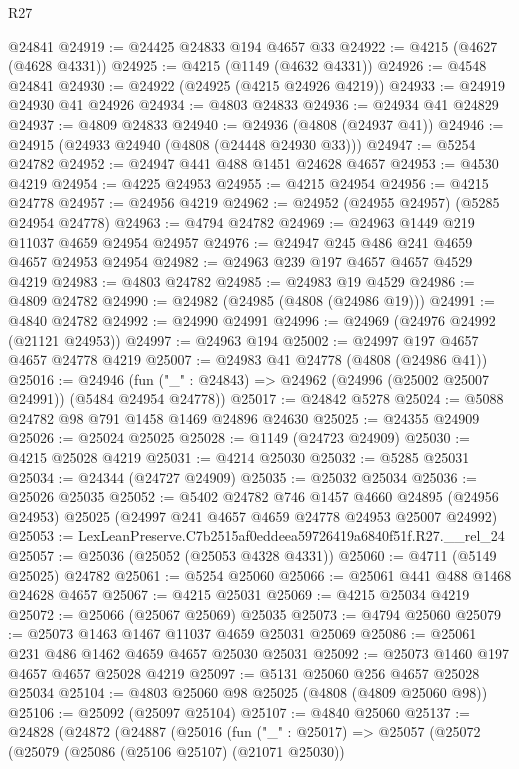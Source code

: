 \begin{lexlean}{R27}
\begin{coremodule}
    @24841
@24919 := @24425 @24833 @194 @4657 @33
@24922 := @4215 (@4627 (@4628 @4331))
@24925 := @4215 (@1149 (@4632 @4331))
@24926 := @4548 @24841
@24930 := @24922 (@24925 (@4215 @24926 @4219))
@24933 := @24919 @24930 @41 @24926
@24934 := @4803 @24833
@24936 := @24934 @41 @24829
@24937 := @4809 @24833
@24940 := @24936 (@4808 (@24937 @41))
@24946 := @24915 (@24933 @24940 (@4808 (@24448 @24930 @33)))
@24947 := @5254 @24782
@24952 := @24947 @441 @488 @1451 @24628 @4657
@24953 := @4530 @4219
@24954 := @4225 @24953
@24955 := @4215 @24954
@24956 := @4215 @24778
@24957 := @24956 @4219
@24962 := @24952 (@24955 @24957) (@5285 @24954 @24778)
@24963 := @4794 @24782
@24969 := @24963 @1449 @219 @11037 @4659 @24954 @24957
@24976 := @24947 @245 @486 @241 @4659 @4657 @24953 @24954
@24982 := @24963 @239 @197 @4657 @4657 @4529 @4219
@24983 := @4803 @24782
@24985 := @24983 @19 @4529
@24986 := @4809 @24782
@24990 := @24982 (@24985 (@4808 (@24986 @19)))
@24991 := @4840 @24782
@24992 := @24990 @24991
@24996 := @24969 (@24976 @24992 (@21121 @24953))
@24997 := @24963 @194
@25002 := @24997 @197 @4657 @4657 @24778 @4219
@25007 := @24983 @41 @24778 (@4808 (@24986 @41))
@25016 := @24946
    (fun ("_" : @24843) => @24962 (@24996 (@25002 @25007 @24991)) (@5484 @24954 @24778))
@25017 := @24842 @5278
@25024 := @5088 @24782 @98 @791 @1458 @1469 @24896 @24630
@25025 := @24355 @24909
@25026 := @25024 @25025
@25028 := @1149 (@24723 @24909)
@25030 := @4215 @25028 @4219
@25031 := @4214 @25030
@25032 := @5285 @25031
@25034 := @24344 (@24727 @24909)
@25035 := @25032 @25034
@25036 := @25026 @25035
@25052 := @5402
    @24782
    @746
    @1457
    @4660
    @24895
    (@24956 @24953)
    @25025
    (@24997 @241 @4657 @4659 @24778 @24953 @25007 @24992)
@25053 := LexLeanPreserve.C7b2515af0eddeea59726419a6840f51f.R27.__rel_24
@25057 := @25036 (@25052 (@25053 @4328 @4331))
@25060 := @4711 (@5149 @25025) @24782
@25061 := @5254 @25060
@25066 := @25061 @441 @488 @1468 @24628 @4657
@25067 := @4215 @25031
@25069 := @4215 @25034 @4219
@25072 := @25066 (@25067 @25069) @25035
@25073 := @4794 @25060
@25079 := @25073 @1463 @1467 @11037 @4659 @25031 @25069
@25086 := @25061 @231 @486 @1462 @4659 @4657 @25030 @25031
@25092 := @25073 @1460 @197 @4657 @4657 @25028 @4219
@25097 := @5131 @25060 @256 @4657 @25028 @25034
@25104 := @4803 @25060 @98 @25025 (@4808 (@4809 @25060 @98))
@25106 := @25092 (@25097 @25104)
@25107 := @4840 @25060
@25137 := @24828
    (@24872
      (@24887
        (@25016
          (fun ("_" : @25017) =>
          @25057
            (@25072
              (@25079
                (@25086 (@25106 @25107) (@21071 @25030))

\end{coremodule}
\end{lexlean}

